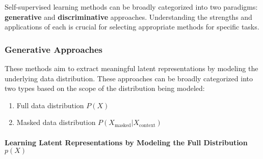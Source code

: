 Self-supervised learning methods can be broadly categorized into two paradigms: \textbf{generative} and \textbf{discriminative} approaches. Understanding the strengths and applications of each is crucial for selecting appropriate methods for specific tasks.

\subsubsection{Generative Approaches}

These methods aim to extract meaningful latent representations by modeling the underlying data distribution. These approaches can be broadly categorized into two types based on the scope of the distribution being modeled:
\begin{enumerate}
    \item Full data distribution $P(X)$
    \item Masked data distribution $P(X_{\text{masked}}|X_{\text{context}})$
\end{enumerate}

\paragraph{Learning Latent Representations by Modeling the Full Distribution $p(X)$}

